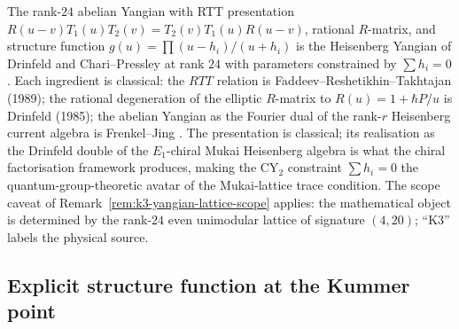 \begin{remark}
\label{rem:k3-abelian-yangian-classical}
The rank-$24$ abelian Yangian with RTT presentation
$R(u-v) T_1(u) T_2(v) = T_2(v) T_1(u) R(u-v)$, rational $R$-matrix, and
structure function $g(u) = \prod(u-h_i)/(u+h_i)$ is the Heisenberg
Yangian of Drinfeld \cite{Drinfeld1985,Drinfeld1988} and Chari--Pressley
\cite{ChariPressley1995} at rank $24$ with parameters constrained by
$\sum h_i = 0$. Each ingredient is classical: the $RTT$ relation
is Faddeev--Reshetikhin--Takhtajan (1989); the rational degeneration of
the elliptic $R$-matrix to $R(u) = 1 + \hbar P/u$ is Drinfeld (1985);
the abelian Yangian as the Fourier dual of the rank-$r$ Heisenberg
current algebra is Frenkel--Jing \cite{FrenkelJing1988}. The
presentation is classical; its realisation as the Drinfeld double of
the $E_1$-chiral Mukai Heisenberg algebra is what the chiral
factorisation framework produces, making the CY$_2$ constraint
$\sum h_i = 0$ the quantum-group-theoretic avatar of the Mukai-lattice
trace condition.
The scope caveat of Remark~\ref{rem:k3-yangian-lattice-scope} applies:
the mathematical object is determined by the rank-$24$ even unimodular
lattice of signature $(4, 20)$; ``K3'' labels the physical source.
\end{remark}



\subsection{Explicit structure function at the Kummer point}
\label{subsec:k3-explicit-structure-function}

